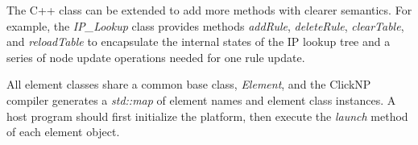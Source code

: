 The C++ class can be extended to add more methods with clearer semantics. For example, the \textit{IP\_Lookup} class provides methods \textit{addRule}, \textit{deleteRule}, \textit{clearTable}, and \textit{reloadTable} to encapsulate the internal states of the IP lookup tree and a series of node update operations needed for one rule update.

All element classes share a common base class, \textit{Element}, and the ClickNP compiler generates a \textit{std::map} of element names and element class instances. A host program should first initialize the platform, then execute the \textit{launch} method of each element object.
